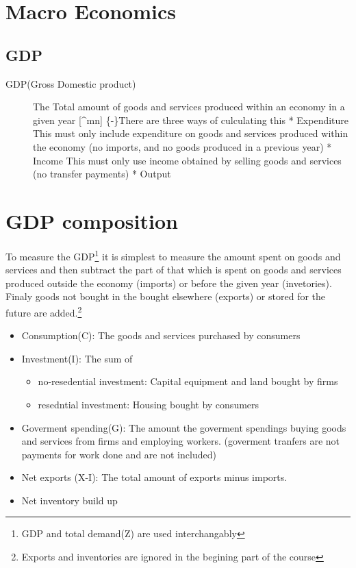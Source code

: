 \documentclass[]{article}
\date{}
\providecommand{\tightlist}{%
  \setlength{\itemsep}{0pt}\setlength{\parskip}{0pt}}
\begin{document}
\hypertarget{macro-economics}{%
\section{Macro Economics}\label{macro-economics}}

\hypertarget{gdp}{%
\subsection{GDP}\label{gdp}}

\begin{description}
\item[GDP(Gross Domestic product)]
The Total amount of goods and services produced within an economy in a
given year {[}\^{}mn{]} \{-\}There are three ways of culculating this *
Expenditure This must only include expenditure on goods and services
produced within the economy (no imports, and no goods produced in a
previous year) * Income This must only use income obtained by selling
goods and services (no transfer payments) * Output
\end{description}

\hypertarget{gdp-composition}{%
\section{GDP composition}\label{gdp-composition}}

To measure the GDP\footnote{GDP and total demand(Z) are used
  interchangably} it is simplest to measure the amount spent on goods
and services and then subtract the part of that which is spent on goods
and services produced outside the economy (imports) or before the given
year (invetories). Finaly goods not bought in the bought elsewhere
(exports) or stored for the future are added.\footnote{Exports and
  inventories are ignored in the begining part of the course}

\begin{itemize}
\tightlist
\item
  Consumption(C): The goods and services purchased by consumers
\item
  Investment(I): The sum of

  \begin{itemize}
  \tightlist
  \item
    no-resedential investment: Capital equipment and land bought by
    firms
  \item
    resedntial investment: Housing bought by consumers
  \end{itemize}
\item
  Goverment spending(G): The amount the goverment spendings buying goods
  and services from firms and employing workers. (goverment tranfers are
  not payments for work done and are not included)
\item
  Net exports (X-I): The total amount of exports minus imports.
\item
  Net inventory build up
\end{itemize}
\end{document}
